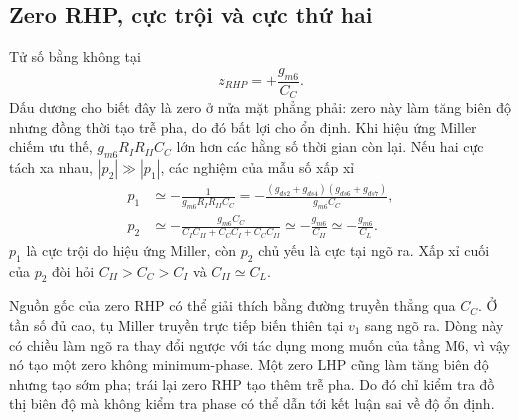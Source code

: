 \documentclass[11pt,a4paper]{report}
\begin{document}
\subsection{Zero RHP, cực trội và cực thứ hai}
Tử số bằng không tại
\begin{equation}
z_{RHP}=+\frac{g_{m6}}{C_C}.
\end{equation}
Dấu dương cho biết đây là zero ở nửa mặt phẳng phải: zero này làm tăng biên độ
nhưng đồng thời tạo trễ pha, do đó bất lợi cho ổn định. Khi hiệu ứng Miller chiếm
ưu thế,
$g_{m6}R_IR_{II}C_C$ lớn hơn các hằng số thời gian còn lại. Nếu hai cực tách xa
nhau, $|p_2|\gg|p_1|$, các nghiệm của mẫu số xấp xỉ
\begin{align}
p_1&\simeq-\frac{1}{g_{m6}R_IR_{II}C_C}
=-\frac{(g_{ds2}+g_{ds4})(g_{ds6}+g_{ds7})}{g_{m6}C_C},\\
p_2&\simeq-\frac{g_{m6}C_C}
{C_IC_{II}+C_CC_I+C_CC_{II}}
\simeq-\frac{g_{m6}}{C_{II}}
\simeq-\frac{g_{m6}}{C_L}.
\end{align}
$p_1$ là cực trội do hiệu ứng Miller, còn $p_2$ chủ yếu là cực tại ngõ ra.
Xấp xỉ cuối của $p_2$ đòi hỏi $C_{II}>C_C>C_I$ và $C_{II}\simeq C_L$.

Nguồn gốc của zero RHP có thể giải thích bằng đường truyền thẳng qua $C_C$.
Ở tần số đủ cao, tụ Miller truyền trực tiếp biến thiên tại $v_1$ sang ngõ ra.
Dòng này có chiều làm ngõ ra thay đổi ngược với tác dụng mong muốn của tầng M6,
vì vậy nó tạo một zero không minimum-phase. Một zero LHP cũng làm tăng biên độ
nhưng tạo sớm pha; trái lại zero RHP tạo thêm trễ pha. Do đó chỉ kiểm tra đồ thị
biên độ mà không kiểm tra phase có thể dẫn tới kết luận sai về độ ổn định.
\end{document}
